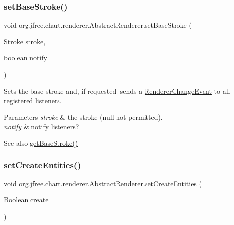 \subsubsection{\texorpdfstring{set\+Base\+Stroke()}{setBaseStroke()}\hspace{0.1cm}{\footnotesize\ttfamily [2/2]}}
{\footnotesize\ttfamily void org.\+jfree.\+chart.\+renderer.\+Abstract\+Renderer.\+set\+Base\+Stroke (\begin{DoxyParamCaption}\item[{Stroke}]{stroke,  }\item[{boolean}]{notify }\end{DoxyParamCaption})}

Sets the base stroke and, if requested, sends a \mbox{\hyperlink{}{Renderer\+Change\+Event}} to all registered listeners.


\begin{DoxyParams}{Parameters}
{\em stroke} & the stroke ({\ttfamily null} not permitted). \\
\hline
{\em notify} & notify listeners?\\
\hline
\end{DoxyParams}
\begin{DoxySeeAlso}{See also}
\mbox{\hyperlink{classorg_1_1jfree_1_1chart_1_1renderer_1_1_abstract_renderer_a7590a423fb0ba5895a876a7068b37951}{get\+Base\+Stroke()}} 
\end{DoxySeeAlso}
\mbox{\label{classorg_1_1jfree_1_1chart_1_1renderer_1_1_abstract_renderer_a7e5a889b80f3d9993cef5a1ac89449ba}} 
\subsubsection{\texorpdfstring{set\+Create\+Entities()}{setCreateEntities()}\hspace{0.1cm}{\footnotesize\ttfamily [1/2]}}
{\footnotesize\ttfamily void org.\+jfree.\+chart.\+renderer.\+Abstract\+Renderer.\+set\+Create\+Entities (\begin{DoxyParamCaption}\item[{Boolean}]{create }\end{DoxyParamCaption})}

